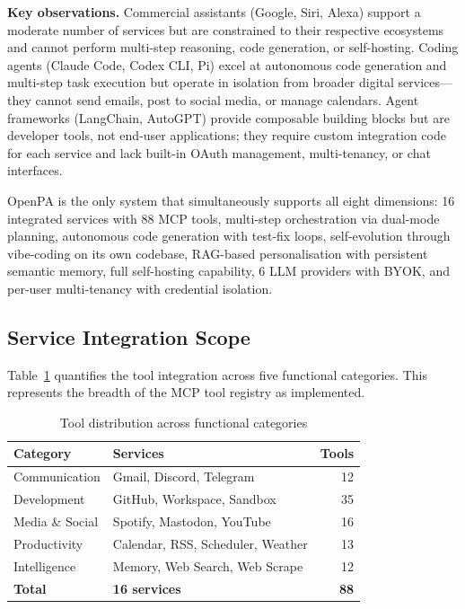 \textbf{Key observations.} Commercial assistants (Google, Siri, Alexa) support a moderate number of services but are constrained to their respective ecosystems and cannot perform multi-step reasoning, code generation, or self-hosting. Coding agents (Claude Code, Codex CLI, Pi) excel at autonomous code generation and multi-step task execution but operate in isolation from broader digital services---they cannot send emails, post to social media, or manage calendars. Agent frameworks (LangChain, AutoGPT) provide composable building blocks but are developer tools, not end-user applications; they require custom integration code for each service and lack built-in OAuth management, multi-tenancy, or chat interfaces.

OpenPA is the only system that simultaneously supports all eight dimensions: 16 integrated services with 88 MCP tools, multi-step orchestration via dual-mode planning, autonomous code generation with test-fix loops, self-evolution through vibe-coding on its own codebase, RAG-based personalisation with persistent semantic memory, full self-hosting capability, 6 LLM providers with BYOK, and per-user multi-tenancy with credential isolation.

\subsection{Service Integration Scope}

Table~\ref{tab:toolscope} quantifies the tool integration across five functional categories. This represents the breadth of the MCP tool registry as implemented.

\begin{table}[H]
\centering
\caption{Tool distribution across functional categories}
\label{tab:toolscope}
\begin{tabular}{l l r}
\toprule
\textbf{Category} & \textbf{Services} & \textbf{Tools} \\
\midrule
Communication    & Gmail, Discord, Telegram                      & 12 \\
Development      & GitHub, Workspace, Sandbox                    & 35 \\
Media \& Social  & Spotify, Mastodon, YouTube                    & 16 \\
Productivity     & Calendar, RSS, Scheduler, Weather             & 13 \\
Intelligence     & Memory, Web Search, Web Scrape                & 12 \\
\midrule
\textbf{Total}   & \textbf{16 services}                          & \textbf{88} \\
\bottomrule
\end{tabular}
\end{table}

